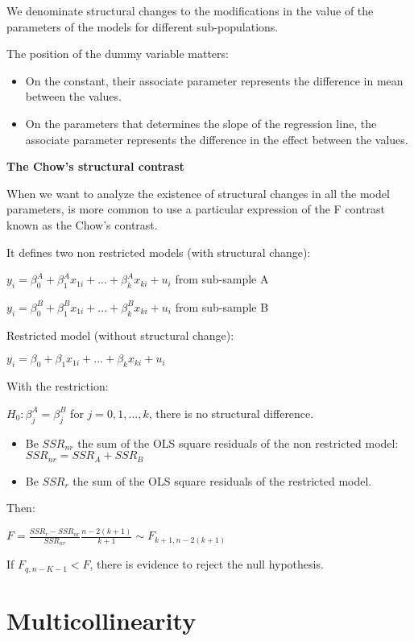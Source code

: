\documentclass[10pt, a4paper, landscape]{extarticle}
\begin{document}
\begin{multicols}{3}
We denominate structural changes to the modifications in the value of the parameters of the models for different sub-populations.

The position of the dummy variable matters:
\begin{itemize}[leftmargin=*]
\item On the constant, their associate parameter represents the difference in mean between the values.
\item On the parameters that determines the slope of the regression line, the associate parameter represents the difference in the effect between the values.
\end{itemize}

\textbf{The Chow's structural contrast}

When we want to analyze the existence of structural changes in all the model parameters, is more common to use a particular expression of the F contrast known as the Chow's contrast.

It defines two non restricted models (with structural change):

$y_i = \beta_0^A + \beta_1^A x_{1i} + ... + \beta_k^A x_{ki} + u_i$ from sub-sample A

$y_i = \beta_0^B + \beta_1^B x_{1i} + ... + \beta_k^B x_{ki} + u_i$ from sub-sample B

Restricted model (without structural change):

$y_i = \beta_0 + \beta_1 x_{1i} + ... + \beta_k x_{ki} + u_i$

With the restriction:

$H_0: \beta_j^A = \beta_j^B$ for $j=0,1,...,k$, there is no structural difference.

\begin{itemize}[leftmargin=*]
\item Be $SSR_{nr}$ the sum of the OLS square residuals of the non restricted model: $SSR_{nr} = SSR_A + SSR_B$
\item Be $SSR_r$ the sum of the OLS square residuals of the restricted model.
\end{itemize}

Then:

$F = \frac{SSR_r - SSR_{nr}}{SSR_{nr}} \frac{n-2(k+1)}{k+1} \sim F_{k+1,n-2(k+1)}$

If $F_{q, n-K-1} < F$, there is evidence to reject the null hypothesis.

\section*{Multicollinearity}


\end{multicols}
\end{document}
